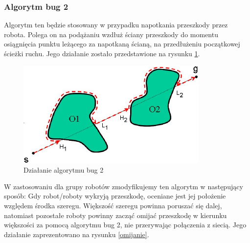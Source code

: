 \documentclass[a4paper, 12pt]{article}
\begin{document}
	\subsubsection{Algorytm bug 2}
	Algorytm ten będzie stosowany w przypadku napotkania przeszkody przez robota. Polega on na podążaniu wzdłuż ściany przeszkody do momentu osiągnięcia punktu leżącego za napotkaną ścianą, na przedłużeniu początkowej ścieżki ruchu. Jego działanie zostało przedstawione na rysunku \ref{bug2_img}.
	\begin{figure}[h!]
		\centering
		\includegraphics*[width=0.7\columnwidth]{img/40-0.png}
		\caption{Działanie algorytmu bug 2}
		\label{bug2_img}
	\end{figure}
	W zastosowaniu dla grupy robotów zmodyfikujemy ten algorytm w następujący sposób:
	Gdy robot/roboty wykryją przeszkodę, oceniane jest jej położenie względem środka szeregu. Większość szeregu powinna poruszać się dalej, natomiast pozostałe roboty powinny zacząć omijać przeszkodę w kierunku większości za pomocą algorytmu bug 2, nie przerywając połączenia z siecią. Jego działanie zaprezentowano na rysunku \ref{omijanie}.
\end{document}
